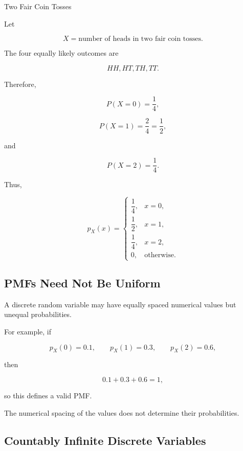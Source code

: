 \begin{workedexamplebox}{Two Fair Coin Tosses}

Let

\[
X
=
\text{number of heads in two fair coin tosses}.
\]

The four equally likely outcomes are

\[
HH,HT,TH,TT.
\]

Therefore,

\[
P(X=0)=\frac14,
\]

\[
P(X=1)=\frac24=\frac12,
\]

and

\[
P(X=2)=\frac14.
\]

Thus,

\begin{answerbox}
\[
\boxed{
p_X(x)
=
\begin{cases}
\dfrac14,&x=0,\\[2mm]
\dfrac12,&x=1,\\[2mm]
\dfrac14,&x=2,\\[2mm]
0,&\text{otherwise}.
\end{cases}
}
\]
\end{answerbox}

\end{workedexamplebox}

\subsection{PMFs Need Not Be Uniform}
\label{subsec:nonuniform-pmf}

A discrete random variable may have equally spaced numerical values but
unequal probabilities.

For example, if

\[
p_X(0)=0.1,
\qquad
p_X(1)=0.3,
\qquad
p_X(2)=0.6,
\]

then

\[
\boxed{
0.1+0.3+0.6=1,
}
\]

so this defines a valid PMF.

The numerical spacing of the values does not determine their
probabilities.

\subsection{Countably Infinite Discrete Variables}
\label{subsec:countably-infinite-rv}

